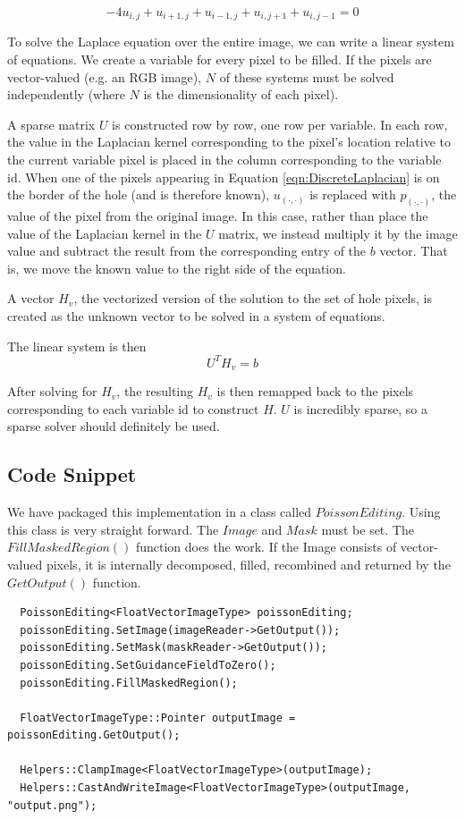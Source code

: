 \documentclass{InsightArticle}
\begin{document}
\begin{equation}
\label{eqn:DiscreteLaplacian}
-4 u_{i,j} + u_{i+1,j} + u_{i-1,j} + u_{i,j+1} + u_{i,j-1} = 0
\end{equation}

To solve the Laplace equation over the entire image, we can write a linear system of equations. We create a variable for every pixel to be filled. If the pixels are vector-valued (e.g. an RGB image), $N$ of these systems must be solved independently (where $N$ is the dimensionality of each pixel).

A sparse matrix $U$ is constructed row by row, one row per variable. In each row, the value in the Laplacian kernel corresponding to the pixel's location relative to the current variable pixel is placed in the column corresponding to the variable id. When one of the pixels appearing in Equation \ref{eqn:DiscreteLaplacian} is on the border of the hole (and is therefore known), $u_{(\cdot,\cdot)}$ is replaced with $p_{(\cdot,\cdot)}$, the value of the pixel from the original image. In this case, rather than place the value of the Laplacian kernel in the $U$ matrix, we instead multiply it by the image value and subtract the result from the corresponding entry of the $b$ vector. That is, we move the known value to the right side of the equation.

A vector $H_v$, the vectorized version of the solution to the set of hole pixels, is created as the unknown vector to be solved in a system of equations.

The linear system is then
\begin{equation}
 U^T H_v = b
\end{equation}

After solving for $H_v$, the resulting $H_v$ is then remapped back to the pixels corresponding to each variable id to construct $H$. $U$ is incredibly sparse, so a sparse solver should definitely be used.

\subsection{Code Snippet}
We have packaged this implementation in a class called $PoissonEditing$. Using this class is very straight forward. The $Image$ and $Mask$ must be set. The $FillMaskedRegion()$ function does the work. If the Image consists of vector-valued pixels, it is internally decomposed, filled, recombined and returned by the $GetOutput()$ function.

\begin{verbatim}
  PoissonEditing<FloatVectorImageType> poissonEditing;
  poissonEditing.SetImage(imageReader->GetOutput());
  poissonEditing.SetMask(maskReader->GetOutput());
  poissonEditing.SetGuidanceFieldToZero();
  poissonEditing.FillMaskedRegion();

  FloatVectorImageType::Pointer outputImage = poissonEditing.GetOutput();

  Helpers::ClampImage<FloatVectorImageType>(outputImage);
  Helpers::CastAndWriteImage<FloatVectorImageType>(outputImage, "output.png");
\end{verbatim}
\end{document}
